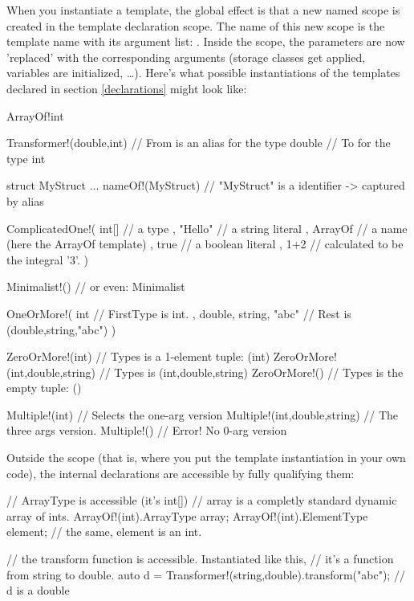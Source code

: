 When you instantiate a template, the global effect is that a new named scope is created in the template declaration scope. The name of this new scope is the template name with its argument list: . Inside the scope, the parameters are now 'replaced' with the corresponding arguments (storage classes get applied, variables are initialized, \ldots). Here's what possible instantiations of the templates declared in section \ref{declarations} might look like:
\begin{dcode}
ArrayOf!int

Transformer!(double,int) // From is an alias for the type double
                         // To for the type int

struct MyStruct { ... }
nameOf!(MyStruct) // "MyStruct" is a identifier -> captured by alias

ComplicatedOne!( int[]   // a type
               , "Hello" // a string literal
               , ArrayOf // a name (here the ArrayOf template)
               , true    // a boolean literal
               , 1+2     // calculated to be the integral '3'.
               )

Minimalist!()
// or even:
Minimalist

OneOrMore!( int                   // FirstType is int.
          , double, string, "abc" // Rest is (double,string,"abc")
          )

ZeroOrMore!(int)               // Types is a 1-element tuple: (int)
ZeroOrMore!(int,double,string) // Types is (int,double,string)
ZeroOrMore!()                  // Types is the empty tuple: ()

Multiple!(int)               // Selects the one-arg version
Multiple!(int,double,string) // The three args version.
Multiple!()                  // Error! No 0-arg version
\end{dcode}

Outside the scope (that is, where you put the template instantiation in your own code), the internal declarations are accessible by fully qualifying them:

\begin{dcode}
// ArrayType is accessible (it's int[])
// array is a completly standard dynamic array of ints.
ArrayOf!(int).ArrayType array; 
ArrayOf!(int).ElementType element; // the same, element is an int.

// the transform function is accessible. Instantiated like this, 
// it's a function from string to double. 
auto d = Transformer!(string,double).transform("abc"); // d is a double
\end{dcode}

